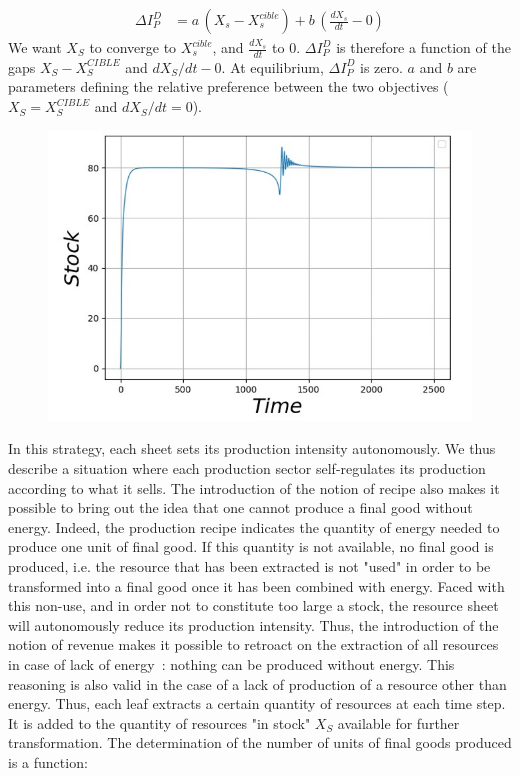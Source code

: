 \documentclass[12pt,a4paper]{article}%
\begin{document}
\begin{appendix}
\begin{align}
	\Delta I_{P}^{D} &= a \, (X_s-X_s^{cible}) + b \, (\frac{dX_s}{dt}-0)
\end{align}
We want $X_S$ to converge to $X_s^{cible}$, and $\frac{dX_s}{dt}$ to 0.
$\Delta I_{P}^{D}$ is therefore a function of the gaps $X_{S}-X_{S}^{CIBLE}$ and $dX_{S}/dt-0$. At equilibrium, $\Delta I_{P}^{D}$ is zero. $a$ and $b$ are parameters defining the relative preference between the two objectives ($X_{S}=X_{S}^{CIBLE}$ and $dX_{S}/dt=0$).  
\begin{figure}[h] 
	\centering \includegraphics[width=1.0\textwidth]{figures/Stock-t.jpg}
\end{figure} 
In this strategy, each sheet sets its production intensity autonomously. We thus describe a situation where each production sector self-regulates its production according to what it sells. The introduction of the notion of recipe also makes it possible to bring out the idea that one cannot produce a final good without energy. Indeed, the production recipe indicates the quantity of energy needed to produce one unit of final good. If this quantity is not available, no final good is produced, i.e. the resource that has been extracted is not "used" in order to be transformed into a final good once it has been combined with energy. Faced with this non-use, and in order not to constitute too large a stock, the resource sheet will autonomously reduce its production intensity. Thus, the introduction of the notion of revenue makes it possible to retroact on the extraction of all resources in case of lack of energy~: nothing can be produced without energy. This reasoning is also valid in the case of a lack of production of a resource other than energy.  Thus, each leaf extracts a certain quantity of resources at each time step. It is added to the quantity of resources "in stock" $X_{S}$ available for further transformation. The determination of the number of units of final goods produced is a function:

\end{appendix}
\end{document}
